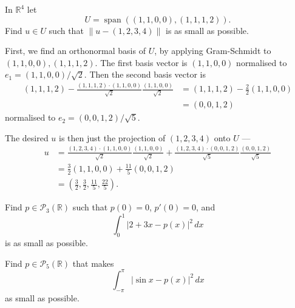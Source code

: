 \documentclass[12 pt, letterpaper]{hmcpset}
\begin{document}
\pagebreak

\begin{problem}[11]
	In $\mathbb{R}^{4}$ let
	 \[
		U = \operatorname{span}((1, 1, 0, 0), (1, 1, 1, 2)).
	\]
	Find $u \in U$ such that $\lVert u - (1, 2, 3, 4) \rVert$ is as small as possible.
\end{problem}

\begin{solution}
	First, we find an orthonormal basis of $U$, by applying Gram-Schmidt to $(1, 1, 0, 0), (1, 1, 1, 2)$. The first basis vector is $(1, 1, 0, 0)$ normalised to $e_{1} = (1, 1, 0, 0)/\sqrt{2}$. Then the second basis vector is
	\[
		\begin{split}
			(1, 1, 1, 2) - \frac{(1, 1, 1, 2) \cdot (1, 1, 0, 0)}{\sqrt{2}} \frac{(1, 1, 0, 0)}{\sqrt{2}} & = (1, 1, 1, 2) - \frac{2}{2} (1, 1, 0, 0) \\
														      & = (0, 0, 1, 2)
		\end{split}
	\]
	normalised to $e_{2} = (0, 0, 1, 2) / \sqrt{5}$.

	The desired $u$ is then just the projection of  $(1, 2, 3, 4)$ onto $U$ ---
	\[
		\begin{split}
			u & = \frac{(1, 2, 3, 4) \cdot (1, 1, 0, 0)}{\sqrt{2}} \frac{(1, 1, 0, 0)}{\sqrt{2}} + \frac{(1, 2, 3, 4) \cdot (0, 0, 1, 2)}{\sqrt{5}} \frac{(0, 0, 1, 2)}{\sqrt{5}} \\
			  & = \frac{3}{2} (1, 1, 0, 0) + \frac{11}{5} (0, 0, 1, 2) \\
			  & = \left ( \frac{3}{2}, \frac{3}{2}, \frac{11}{5}, \frac{22}{5} \right ).
		\end{split}
	\]
\end{solution}

\pagebreak

\begin{problem}[12]
	Find $p \in \mathcal{P}_{3}(\mathbb{R})$ such that $p(0) = 0$, $p'(0) = 0$, and
	\[
		\int_{0}^{1} \lvert 2 + 3x - p(x) \rvert^{2} \, dx 
	\]
	is as small as possible.
\end{problem}

\pagebreak

\begin{problem}[13]
	Find $p \in \mathcal{P}_{5}(\mathbb{R})$ that makes
	\[
		\int_{- \pi}^{\pi} \lvert \sin{x} - p(x) \rvert^{2} \, dx 
	\]
	as small as possible.
\end{problem}

\pagebreak
\end{document}
